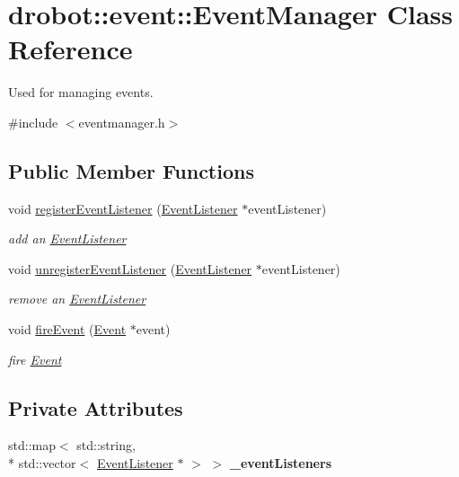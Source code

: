 \hypertarget{classdrobot_1_1event_1_1EventManager}{\section{drobot\-:\-:event\-:\-:Event\-Manager Class Reference}
\label{classdrobot_1_1event_1_1EventManager}
}


Used for managing events.  




{\ttfamily \#include $<$eventmanager.\-h$>$}

\subsection*{Public Member Functions}
\begin{DoxyCompactItemize}
\item 
void \hyperlink{classdrobot_1_1event_1_1EventManager_a9d8046d9f53a50414294385a2cf3b73f}{register\-Event\-Listener} (\hyperlink{classdrobot_1_1event_1_1EventListener}{Event\-Listener} $\ast$event\-Listener)
\begin{DoxyCompactList}\small\item\em add an \hyperlink{classdrobot_1_1event_1_1EventListener}{Event\-Listener} \end{DoxyCompactList}\item 
void \hyperlink{classdrobot_1_1event_1_1EventManager_a947d28a494697d51eb33e4da4878f4e6}{unregister\-Event\-Listener} (\hyperlink{classdrobot_1_1event_1_1EventListener}{Event\-Listener} $\ast$event\-Listener)
\begin{DoxyCompactList}\small\item\em remove an \hyperlink{classdrobot_1_1event_1_1EventListener}{Event\-Listener} \end{DoxyCompactList}\item 
void \hyperlink{classdrobot_1_1event_1_1EventManager_a8961eb4b97c48e0e02566b4ccffca98a}{fire\-Event} (\hyperlink{classdrobot_1_1event_1_1Event}{Event} $\ast$event)
\begin{DoxyCompactList}\small\item\em fire \hyperlink{classdrobot_1_1event_1_1Event}{Event} \end{DoxyCompactList}\end{DoxyCompactItemize}
\subsection*{Private Attributes}
\begin{DoxyCompactItemize}
\item 
\hypertarget{classdrobot_1_1event_1_1EventManager_a798786a397eacf61b7ee79a6c5238605}{std\-::map$<$ std\-::string, \\*
std\-::vector$<$ \hyperlink{classdrobot_1_1event_1_1EventListener}{Event\-Listener} $\ast$ $>$ $>$ {\bfseries \-\_\-event\-Listeners}}\label{classdrobot_1_1event_1_1EventManager_a798786a397eacf61b7ee79a6c5238605}

\end{DoxyCompactItemize}


